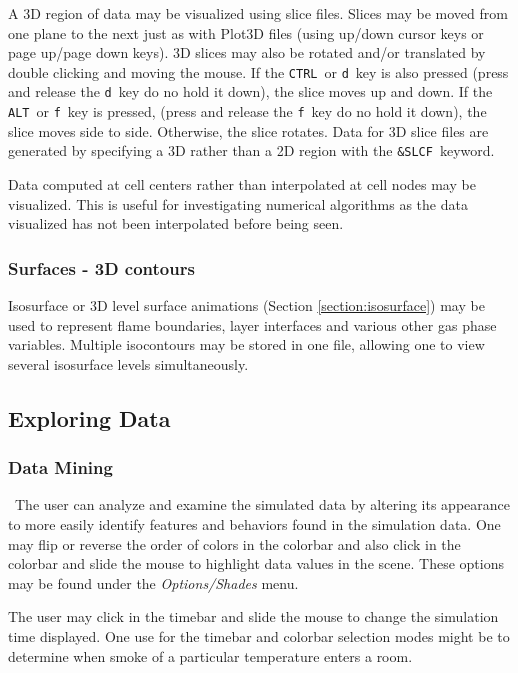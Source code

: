\documentclass[11pt,twoside]{book}
\begin{document}
A 3D region of
data may be visualized using slice files.  Slices may be moved from one plane to
the next just as with Plot3D files (using up/down cursor keys or
page up/page down keys).
3D slices may also be rotated and/or translated by double clicking and
moving the mouse. If the {\tt CTRL}\ or {\tt d}\ key
is also pressed
(press and release the {\tt d}\ key do no hold it down),
the slice moves up and down.
If the {\tt ALT}\ or {\tt f}\ key is pressed,
(press and release the {\tt f}\ key do no hold it down),
the slice moves side to side.
Otherwise, the slice rotates.
Data for 3D slice files are generated by specifying a 3D rather than a
2D region with the {\tt \&SLCF}\ keyword.

Data computed at cell centers rather than interpolated at cell nodes may be visualized.
This is useful for investigating numerical algorithms as the data visualized
has not been interpolated before being seen.

\subsubsection{Surfaces - 3D contours}
Isosurface or 3D level surface animations (Section
\ref{section:isosurface}) may be used to represent flame
boundaries, layer interfaces and various other gas phase
variables. Multiple isocontours may be stored in one file,
allowing one to view several isosurface levels simultaneously.


\subsection{Exploring Data}

\subsubsection{Data Mining}\ The user can analyze and examine the simulated
data by altering its appearance to more easily identify features
and behaviors found in the simulation data. One may flip or
reverse the order of colors in the colorbar and also click in the
colorbar and slide the mouse to highlight data values in the
scene. These options may be found under the {\em Options/Shades}
menu.

The user may click in the timebar and slide the mouse to
change the simulation time displayed. One use for the timebar and colorbar selection modes might be to determine
when smoke of a particular temperature enters a room.
\end{document}
